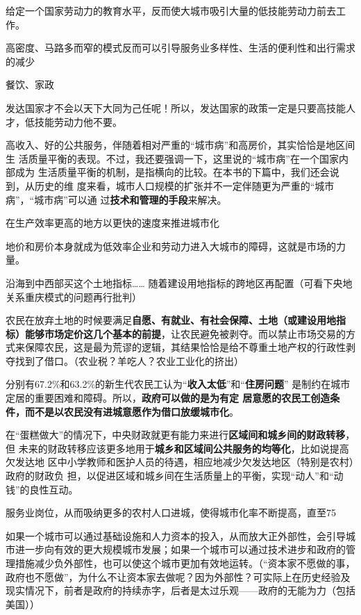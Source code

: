 给定一个国家劳动力的教育水平，反而使大城市吸引大量的低技能劳动力前去工作。

高密度、马路多而窄的模式反而可以引导服务业多样性、生活的便利性和出行需求的减少

餐饮、家政

发达国家才不会以天下大同为己任呢！所以，发达国家的政策一定是只要高技能人才，低技能劳动力他不要。

高收入、好的公共服务，伴随着相对严重的“城市病”和高房价，其实恰恰是地区间生
活质量平衡的表现。不过，我还要强调一下，这里说的“城市病”在一个国家内部成为
生活质量平衡的机制，是指横向的比较。在本书的下篇中，我们还会说到，从历史的维
度来看，城市人口规模的扩张并不一定伴随更为严重的“城市病”，“城市病”可以通
过{\bf 技术和管理的手段}来解决。

在生产效率更高的地方以更快的速度来推进城市化

地价和房价本身就成为低效率企业和劳动力进入大城市的障碍，这就是市场的力量。

沿海到中西部买这个土地指标…… 随着建设用地指标的跨地区再配置（可看下央地关系重庆模式的问题再行批判）

农民在放弃土地的时候要满足{\bf 自愿、有就业、有社会保障、土地（或建设用地指标）能够市场定价这几个基本的前提}，让农民避免被剥夺。而以禁止市场交易的方式来保障农民，这是最为荒谬的逻辑，其结果恰恰是给不尊重土地产权的行政性剥夺找到了借口。（农业税？羊吃人？农业工业化的挤出）

分别有67.2\%和63.2\%的新生代农民工认为“{\bf 收入太低}”和“{\bf 住房问题}”
          是制约在城市定居的重要困难和障碍。所以，{\bf 政府可以做的是为有定
          居意愿的农民工创造条件，而不是以农民没有进城意愿作为借口放缓城市化}。

在“蛋糕做大”的情况下，中央财政就更有能力来进行{\bf 区域间和城乡间的财政转移}，但
未来的财政转移应该更多地用于{\bf 城乡和区域间公共服务的均等化}，比如说提高欠发达地
区中小学教师和医护人员的待遇，相应地减少欠发达地区（特别是农村）政府的财政负
担，以促进区域和城乡间在生活质量上的平衡，实现“动人”和“动钱”的良性互动。

服务业岗位，从而吸纳更多的农村人口进城，使得城市化率不断提高，直至75%


如果一个城市可以通过基础设施和人力资本的投入，从而放大正外部性，会引导城市进一步向有效的更大规模城市发展；如果一个城市可以通过技术进步和政府的管理措施减少负外部性，也可以使这个城市更加有效地运转。（“资本家不愿做的事，政府也不愿做”，为什么不让资本家去做呢？因为外部性？可实际上在历史经验及现实情况下，前者是政府的持续赤字，后者是太过乐观——政府的无能为力（包括美国））

